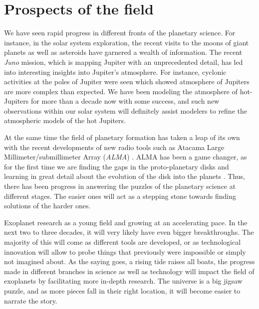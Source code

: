 \section{Prospects of the field}
We have seen rapid progress in different fronts of the planetary science. For instance, in the solar system exploration, the recent visits to the moons of giant planets  as well as asteroids have garnered a wealth of information. The recent \textit{Juno} mission, which is mapping Jupiter with an unprecedented detail, has led into interesting insights into Jupiter's atmosphere. For instance, cyclonic activities at the poles of Jupiter were seen \citep{kaspi2018, adriani2018} which showed atmosphere of Jupiters are more complex than expected. We have been modeling the atmosphere of hot-Jupiters for more than a decade now with some success, and such new observations within our solar system will definitely assist modelers to refine the atmospheric models of the hot Jupiters.

At the same time the field of planetary formation has taken a leap of its own with the recent developments of new radio tools such as Atacama Large Millimeter/submillimeter Array (\textit{ALMA}) \citep{alma2015}. ALMA has been a game changer, as for the first time we are finding the gaps in the proto-planetary disks \citep{andrews2016} and learning in great detail about the evolution of the disk into the planets \citep{hughes2018}. Thus, there has been progress in answering the puzzles of the planetary science at different stages. The easier ones will act as a stepping stone towards finding solutions of the harder ones.

Exoplanet research as a young field and growing at an accelerating pace. In the next two to three decades, it will very likely have even bigger breakthroughs. The majority of this will come as different tools are developed, or as technological innovation will allow to probe things that previously were impossible or simply not imagined about. As the saying goes, a rising tide raises all boats, the progress made in different branches in science as well as technology will impact the field of exoplanets by facilitating more in-depth research. The universe is a big jigsaw puzzle, and as more pieces fall in their right location, it will become easier to narrate the story.
